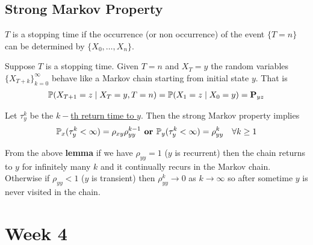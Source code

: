 \documentclass[12pt,a4paper]{article}
\begin{document}
\subsection{Strong Markov Property}
\begin{defn}
$T$ is a stopping time if the occurrence (or non occurrence) of the event $\{T = n\}$ can be determined by $\{X_0, \ldots, X_n\}$. 
\end{defn}
\begin{thm}
Suppose $T$ is a stopping time. Given $T = n$ and $X_T = y$ the random variables $\{X_{T+k}\}_{k=0}^\infty$ behave like a Markov chain starting from initial state $y$. That is 
\begin{align*}
\P(X_{T+1} = z \given X_T = y, T = n) = \P(X_1 = z\given X_0 = y) =\vb P_{yz}
\end{align*}
\end{thm}
\begin{lemma}
Let $\tau_y^k$ be the \hyperref[kthret]{$k-$th return time to $y$}. Then the strong Markov property implies 
\begin{align*}
\P_x(\tau_y^k < \infty) = \rho_{xy}\rho_{yy}^{k-1}
\textbf{ or }
\P_y(\tau_y^k < \infty) = \rho_{yy}^{k} &&\forall k \geq 1
\end{align*}
\end{lemma}
\begin{note}
From the above \textbf{lemma} if we have $\rho_{yy} = 1$ ($y$ is recurrent) then the chain returns to $y$ for infinitely many $k$ and it continually
recurs in the Markov chain.\\
Otherwise if $\rho_{yy} < 1$ ($y$ is transient) then $\rho_{yy}^k \to 0$ as $k\to \infty$ so after sometime $y$ is never visited in the chain.  
\end{note}
\newpage
\section{Week 4}
\end{document}
